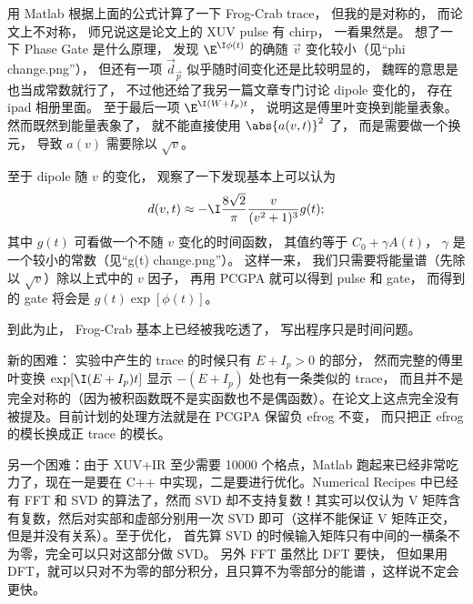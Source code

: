 用 Matlab 根据上面的公式计算了一下 Frog-Crab trace， 但我的是对称的， 而论文上不对称， 师兄说这是论文上的 XUV pulse 有 chirp， 一看果然是。 想了一下 Phase Gate 是什么原理， 发现 $\E^{\I\phi(t)}$ 的确随 $\vec v$ 变化较小（见“phi change.png”）， 但还有一项 $\vec d_{\vec p}$ 似乎随时间变化还是比较明显的， 魏晖的意思是也当成常数就行了， 不过他还给了我另一篇文章专门讨论 dipole 变化的， 存在 ipad 相册里面。 至于最后一项 $\E^{\I(W+I_p)t}$， 说明这是傅里叶变换到能量表象。然而既然到能量表象了， 就不能直接使用 $\abs{a(v, t)}^2$ 了， 而是需要做一个换元， 导致 $a(v)$ 需要除以 $\sqrt{v}$。

至于 dipole 随 $v$ 的变化， 观察了一下发现基本上可以认为
\begin{equation}
d(v, t) \approx -\I \frac{8\sqrt2}{\pi} \frac{v}{(v^2+1)^3} g(t);
\end{equation}
其中 $g(t)$ 可看做一个不随 $v$ 变化的时间函数， 其值约等于 $C_0 + \gamma A(t)$， $\gamma$ 是一个较小的常数（见“g(t) change.png”）。 这样一来， 我们只需要将能量谱（先除以 $\sqrt{v}$）除以上式中的 $v$ 因子， 再用 PCGPA 就可以得到 pulse 和 gate， 而得到的 gate 将会是 $g(t)\exp[\phi(t)]$。

到此为止， Frog-Crab 基本上已经被我吃透了， 写出程序只是时间问题。

新的困难： 实验中产生的 trace 的时候只有 $E + I_p > 0$ 的部分， 然而完整的傅里叶变换  $\exp[\I (E + I_p) t]$ 显示 $-(E + I_p)$ 处也有一条类似的 trace， 而且并不是完全对称的（因为被积函数既不是实函数也不是偶函数）。在论文上这点完全没有被提及。目前计划的处理方法就是在 PCGPA 保留负 efrog 不变， 而只把正 efrog 的模长换成正 trace 的模长。

另一个困难：由于 XUV+IR 至少需要 10000 个格点，Matlab 跑起来已经非常吃力了，现在一是要在 C++ 中实现，二是要进行优化。Numerical Recipes 中已经有 FFT 和 SVD 的算法了，然而 SVD 却不支持复数！其实可以仅认为 V 矩阵含有复数，然后对实部和虚部分别用一次 SVD 即可（这样不能保证 V 矩阵正交，但是并没有关系）。至于优化， 首先算 SVD 的时候输入矩阵只有中间的一横条不为零，完全可以只对这部分做 SVD。 另外 FFT 虽然比 DFT 要快， 但如果用 DFT，就可以只对不为零的部分积分，且只算不为零部分的能谱 ，这样说不定会更快。








